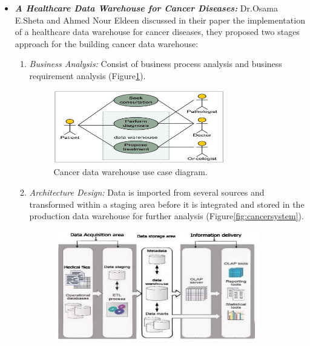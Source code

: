 \begin{itemize}
  \renewcommand{\labelitemi}{$\bullet$}
  \item \textbf{\textit{A Healthcare Data Warehouse for Cancer Diseases:}} Dr.Osama E.Sheta and Ahmed Nour Eldeen discussed in their paper\cite{shetaBuildingHealthCare2012} the implementation of a healthcare data warehouse for cancer diseases, they proposed  two stages approach for the building cancer data warehouse: \bigbreak
  
  \begin{enumerate}
    
    \item \textit{Business Analysis:} Consist of business process analysis and business requirement analysis (Figure\ref{fig:cancerDiagrame}). \newpage
    \begin{figure}[h!]
      \center
      \includegraphics[width=0.75\textwidth]{images/chapter3/relatedwork/cancerDiagrame.PNG}
      \caption{Cancer data warehouse use case diagram.}
      \label{fig:cancerDiagrame}
    \end{figure}
    \item \textit{Architecture Design:} Data is imported from several sources and transformed within a staging area before it is integrated and stored in the production data warehouse for further analysis (Figure\ref{fig:cancersystem}).
     \begin{figure}[h!]
      \center
      \includegraphics[width=0.90\textwidth]{images/chapter3/relatedwork/cancersystem.PNG}

\end{figure}
\end{enumerate}
\end{itemize}
